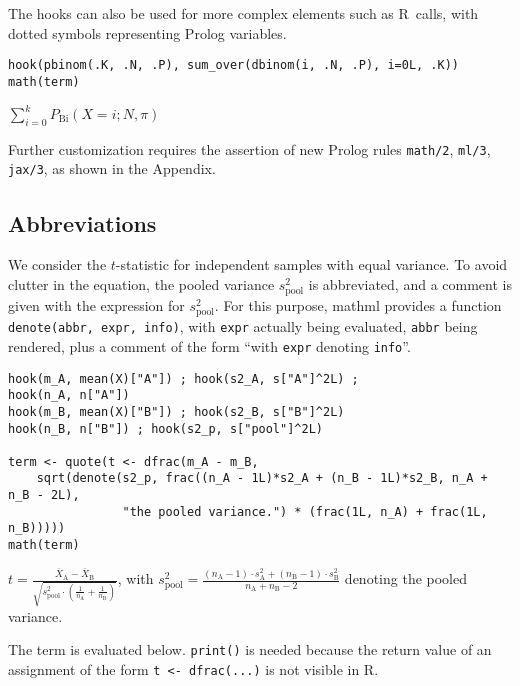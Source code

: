 The hooks can also be used for more complex elements such as R~calls,
with dotted symbols representing Prolog variables.

\begin{verbatim}
hook(pbinom(.K, .N, .P), sum_over(dbinom(i, .N, .P), i=0L, .K))
math(term)
\end{verbatim}

\({\sum}_{{i}{=}{0}}^{k}{{P}_{\mathrm{Bi}}{\left({{X}{=}{i}}{{;}{{N}{{,}{\pi}}}}\right)}}\)

Further customization requires the assertion of new Prolog rules
\texttt{math/2}, \texttt{ml/3}, \texttt{jax/3}, as shown in the Appendix.

\hypertarget{abbreviations}{%
\subsection{Abbreviations}\label{abbreviations}}

We consider the \(t\)-statistic for independent samples with equal
variance. To avoid clutter in the equation, the pooled variance
\(s^2_{\mathrm{pool}}\) is abbreviated, and a comment is given with the
expression for \(s^2_{\mathrm{pool}}\). For this purpose, mathml provides
a function \texttt{denote(abbr,~expr,~info)}, with \texttt{expr} actually being
evaluated, \texttt{abbr} being rendered, plus a comment of the form ``with
\texttt{expr} denoting \texttt{info}''.

\begin{verbatim}
hook(m_A, mean(X)["A"]) ; hook(s2_A, s["A"]^2L) ;
hook(n_A, n["A"])
hook(m_B, mean(X)["B"]) ; hook(s2_B, s["B"]^2L)
hook(n_B, n["B"]) ; hook(s2_p, s["pool"]^2L)

term <- quote(t <- dfrac(m_A - m_B, 
    sqrt(denote(s2_p, frac((n_A - 1L)*s2_A + (n_B - 1L)*s2_B, n_A + n_B - 2L),
                "the pooled variance.") * (frac(1L, n_A) + frac(1L, n_B)))))
math(term)
\end{verbatim}

\({t}{=}{\displaystyle{\frac{{{\overline{X}}_{\mathrm{A}}}{-}{{\overline{X}}_{\mathrm{B}}}}{\sqrt{{{s}_{\mathrm{pool}}^{2}}{\cdot}{\left({\frac{1}{{n}_{\mathrm{A}}}}{+}{\frac{1}{{n}_{\mathrm{B}}}}\right)}}}}}\),
with
\({{s}_{\mathrm{pool}}^{2}}{=}{\frac{{{\left({{n}_{\mathrm{A}}}{-}{1}\right)}{\cdot}{{s}_{\mathrm{A}}^{2}}}{+}{{\left({{n}_{\mathrm{B}}}{-}{1}\right)}{\cdot}{{s}_{\mathrm{B}}^{2}}}}{{{{n}_{\mathrm{A}}}{+}{{n}_{\mathrm{B}}}}{-}{2}}}\)
denoting the pooled variance.

The term is evaluated below. \texttt{print()} is needed because the return
value of an assignment of the form \texttt{t~\textless{}-~dfrac(...)} is not visible in
R.

